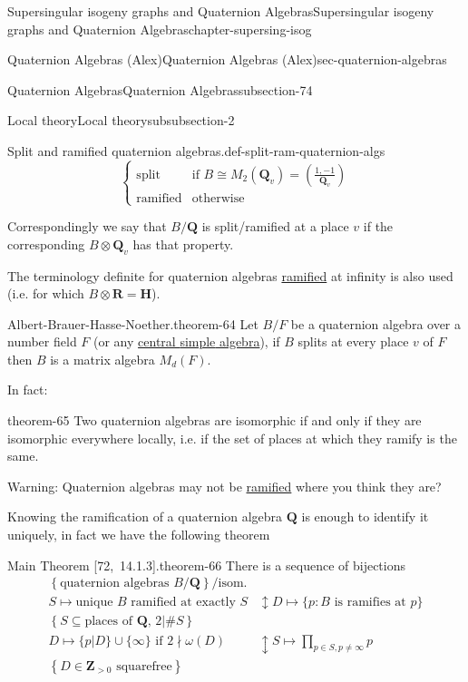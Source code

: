 \documentclass[oneside,10pt,]{book}
\numberwithin{equation}{section}
\newcommand{\legendre}[2]{\left(\frac{#1}{#2}\right)}
\newcommand{\ZZ}{\mathbf{Z}}
\newcommand{\QQ}{\mathbf{Q}}
\newcommand{\RR}{\mathbf{R}}
\newcommand{\HH}{\mathbf{H}}
\newcommand{\gt}{>}
\newcommand{\amp}{&}
\begin{document}
\begin{chapterptx}{Supersingular isogeny graphs and Quaternion Algebras}{}{Supersingular isogeny graphs and Quaternion Algebras}{}{}{chapter-supersing-isog}
\begin{sectionptx}{Quaternion Algebras (Alex)}{}{Quaternion Algebras (Alex)}{}{}{sec-quaternion-algebras}
\begin{subsectionptx}{Quaternion Algebras}{}{Quaternion Algebras}{}{}{subsection-74}
\begin{subsubsectionptx}{Local theory}{}{Local theory}{}{}{subsubsection-2}
\begin{definition}{Split and ramified quaternion algebras.}{def-split-ram-quaternion-algs}
\begin{equation*}
\begin{cases}
\text{split} \amp \text{if } B\cong M_2(\QQ_v)  = \legendre{1,-1}{\QQ_v}\\
\text{ramified} \amp \text{otherwise}
\end{cases}
\end{equation*}
%
\par
\hypertarget{p-924}{}%
Correspondingly we say that \(B/\QQ\) is split/ramified at a place \(v\) if the corresponding \(B\otimes \QQ_v\) has that property.%
\end{definition}
\hypertarget{p-925}{}%
The terminology definite for quaternion algebras \hyperref[def-dess-ramified]{ramified} at infinity is also used (i.e. for which \(B\otimes \RR = \HH\)).%
\begin{theorem}{Albert-Brauer-Hasse-Noether.}{}{theorem-64}%
\hypertarget{p-926}{}%
Let \(B/F\) be a quaternion algebra  over  a  number field \(F\) (or any \hyperref[def-abvar-csa]{central \hyperref[def-simple-av]{simple} algebra}), if \(B\) splits at every place \(v\) of \(F\) then \(B\) is a matrix algebra \(M_d (F)\).%
\end{theorem}
\hypertarget{p-927}{}%
In fact:%
\begin{theorem}{}{}{theorem-65}%
\hypertarget{p-928}{}%
Two quaternion algebras are isomorphic if and only if they are isomorphic everywhere locally, i.e. if the set of places at which they ramify is the same.%
\end{theorem}
\hypertarget{p-929}{}%
Warning: Quaternion algebras may not be \hyperref[def-dess-ramified]{ramified} where you think they are?%
\par
\hypertarget{p-930}{}%
Knowing the ramification of a quaternion algebra \(\QQ\) is enough to identify it uniquely, in fact we have the following theorem%
\begin{theorem}{Main Theorem [72,~14.1.3].}{}{theorem-66}%
\hypertarget{p-931}{}%
There is a sequence of bijections%
\begin{align*}
\left\{ \text{quaternion algebras }B/\QQ \right\}/\text{isom.}\\
S \mapsto \text{unique }B \text{ ramified at exactly }S\amp\updownarrow D\mapsto \{p : B \text{ is ramifies at } p\}\\
\left\{ S \subseteq \text{places of }\QQ,\,2|\#S \right\}\\
D \mapsto \{p|D\} \cup \{\infty\} \text{ if }2\nmid \omega(D)\amp\updownarrow S \mapsto \prod_{p\in S,p\ne \infty} p\\
\left\{ D\in \ZZ_{\gt 0 }\text{ squarefree}\right\}
\end{align*}

\end{theorem}
\end{subsubsectionptx}
\end{subsectionptx}
\end{sectionptx}
\end{chapterptx}
\end{document}
